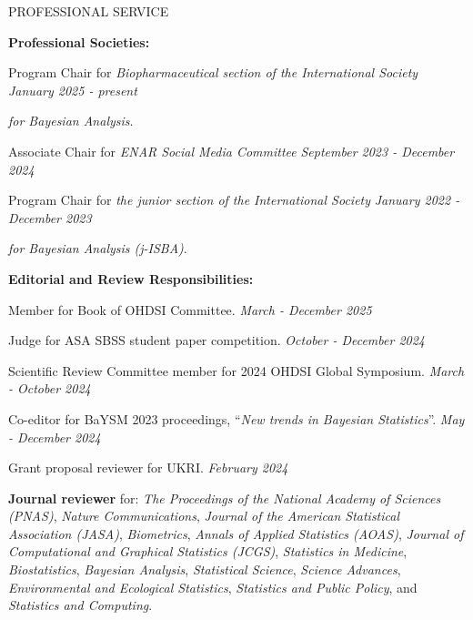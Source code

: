 \documentclass{resume} %
\newcommand{\thisYear}[1]{
	#1
}
\begin{document}
\begin{rSection}{PROFESSIONAL SERVICE}
	
	\hspace*{-0.2in}\textbf{Professional Societies:}
	
	Program Chair for \emph{Biopharmaceutical section of the International Society} \hfill {\em January 2025 - present}


	\vspace{-0.1in}
	\emph{for Bayesian Analysis}.

	
	\thisYear{
	Associate Chair for \emph{ENAR Social Media Committee}  \hfill {\em September 2023 - December 2024}
}

		\smallskip
	
	Program Chair for \emph{the junior section of the International Society} \hfill {\em January 2022 - December 2023}
	
	\vspace{-0.1in}
	\emph{for Bayesian Analysis (j-ISBA)}.
	
\medskip 

 \hspace*{-0.2in}\textbf{Editorial and Review Responsibilities:}
 
 \thisYear{
 Member for Book of OHDSI Committee. \hfill{\em March - December 2025}
 }
 
 \thisYear{
 	Judge for ASA SBSS student paper competition. 	 \hfill {\em October - December 2024}
 }
 	
 		\thisYear{
 	Scientific Review Committee member for 2024 OHDSI Global Symposium. 	\hfill {\em March - October 2024}
 }
 	
 	\smallskip 
	
 Co-editor for BaYSM 2023 proceedings, ``\emph{New trends in Bayesian Statistics}''.	\hfill {\em May - December 2024}

    \smallskip 
    
 
    Grant proposal reviewer for UKRI.	\hfill {\em February 2024}

    
    \smallskip 
    
    \textbf{Journal reviewer} for: \emph{The Proceedings of the National Academy of Sciences (PNAS)}, \emph{Nature Communications}, \emph{Journal of the American Statistical Association (JASA)}, \emph{Biometrics}, \emph{Annals of Applied Statistics (AOAS)}, \emph{Journal of Computational and Graphical Statistics (JCGS)}, \emph{Statistics in Medicine}, \emph{Biostatistics}, \emph{Bayesian Analysis},  \emph{Statistical Science},  \emph{Science Advances}, \emph{Environmental and Ecological Statistics}, \emph{Statistics and Public Policy},  and \emph{Statistics and Computing}. 
    

\end{rSection}
\end{document}
